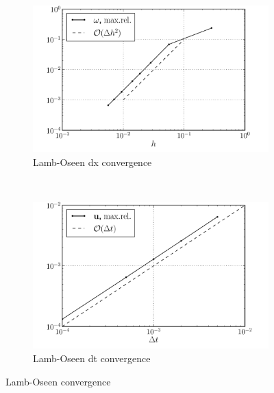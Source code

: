 	\begin{figure}[p]
        \centering
        \begin{subfigure}[b]{0.5\textwidth}
                \includegraphics[width=\textwidth]{figures/eulerian/lambOseen_eulerianConvergence_dx_compressed.pdf}
                \caption{Lamb-Oseen dx convergence}
                \label{fig:lambOseen_eulerianConvergence_dx}
        \end{subfigure}%
        ~ %
        \begin{subfigure}[b]{0.5\textwidth}
                \includegraphics[width=\textwidth]{figures/eulerian/lambOseen_eulerianConvergence_dt_compressed.pdf}
                \caption{Lamb-Oseen dt convergence}
                \label{fig:lambOseen_eulerianConvergence_dt}
        \end{subfigure}
        \caption{Lamb-Oseen convergence}
        \label{fig:lambOseen_eulerianConvergence}
	\end{figure}		
	

